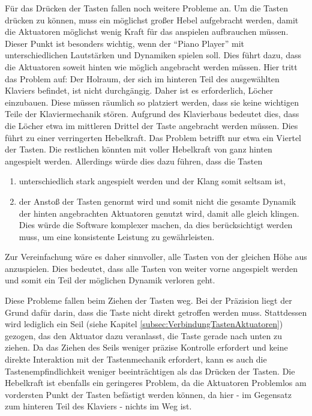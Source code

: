 Für das Drücken der Tasten fallen noch weitere Probleme an. Um die Tasten drücken zu können, muss ein möglichst großer
Hebel aufgebracht werden, damit die Aktuatoren möglichst wenig Kraft für das anspielen aufbrauchen müssen.
Dieser Punkt ist besonders wichtig, wenn der \enquote{Piano Player} mit unterschiedlichen Lautstärken und Dynamiken spielen soll.
Dies führt dazu, dass die Aktuatoren soweit hinten wie möglich angebracht werden müssen. %
\newline
Hier tritt das Problem auf:
Der Holraum, der sich im hinteren Teil des ausgewählten Klaviers befindet, ist nicht durchgängig. Daher ist es
erforderlich, Löcher einzubauen. Diese müssen räumlich so platziert werden, dass sie keine wichtigen Teile der Klaviermechanik
stören. Aufgrund des Klavierbaus bedeutet dies, dass die Löcher etwa im mittleren Drittel der Taste angebracht werden müssen.
Dies führt zu einer verringerten Hebelkraft. Das Problem betrifft nur etwa ein Viertel der Tasten. Die restlichen könnten mit
voller Hebelkraft von ganz hinten angespielt werden. Allerdings würde dies dazu führen, dass die Tasten
\begin{enumerate}
	\item unterschiedlich stark angespielt werden und der Klang somit seltsam ist,
	\item der Anstoß der Tasten genormt wird und somit nicht die gesamte Dynamik der hinten angebrachten Aktuatoren genutzt
	wird, damit alle gleich klingen. Dies würde die Software komplexer machen, da dies berücksichtigt werden muss, um eine
	konsistente Leistung zu gewährleisten.
\end{enumerate}
Zur Vereinfachung wäre es daher sinnvoller, alle Tasten von der gleichen Höhe aus anzuspielen. Dies bedeutet, dass alle
Tasten von weiter vorne angespielt werden und somit ein Teil der möglichen Dynamik verloren geht. \newline

Diese Probleme fallen beim Ziehen der Tasten weg. %
Bei der Präzision liegt der Grund dafür darin, dass die Taste nicht
direkt getroffen werden muss. Stattdessen wird lediglich ein Seil (siehe Kapitel \ref{subsec:VerbindungTastenAktuatoren})
gezogen, das den Aktuator dazu veranlasst, die Taste
gerade nach unten zu ziehen.
Da das Ziehen des Seils weniger präzise Kontrolle erfordert
und keine direkte Interaktion mit der Tastenmechanik erfordert, kann es auch die Tastenempfindlichkeit weniger beeinträchtigen
als das Drücken der Tasten.\newline
Die Hebelkraft ist ebenfalls ein geringeres Problem, da die Aktuatoren Problemlos am vordersten Punkt der Tasten
befästigt werden können, da hier - im Gegensatz zum hinteren Teil des Klaviers - nichts im Weg ist.

